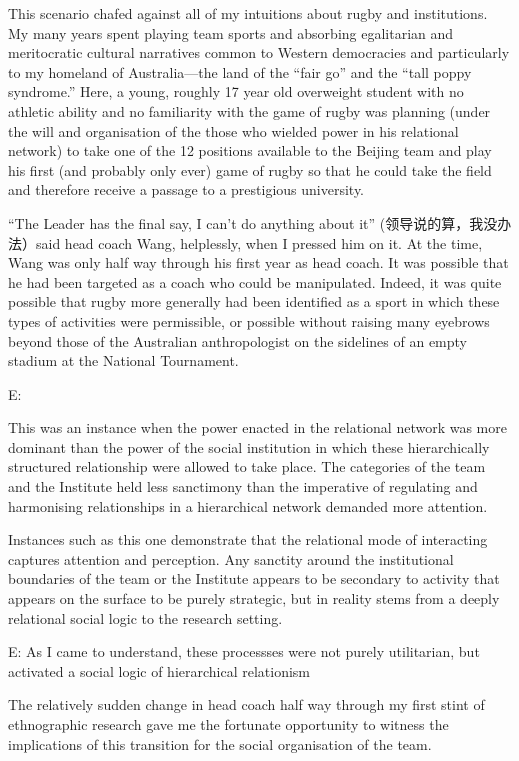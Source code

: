 \begin{CJK}{UTF8}{gbsn}
This scenario chafed against all of my intuitions about rugby and institutions.  My many years spent playing team sports and absorbing egalitarian and meritocratic cultural narratives common to Western democracies and particularly to my homeland of Australia---the land of the ``fair go'' and the ``tall poppy syndrome.''  Here, a young, roughly 17 year old overweight student with no athletic ability and no familiarity with the game of rugby was planning (under the will and organisation of the those who wielded power in his relational network) to take one of the 12 positions available to the Beijing team and play his first (and probably only ever) game of rugby so that he could take the field and therefore receive a passage to a prestigious university.

``The Leader has the final say, I can't do anything about it'' (领导说的算，我没办法）said head coach Wang, helplessly, when I pressed him on it.  At the time, Wang was only half way through his first year as head coach.  It was possible that he had been targeted as a coach who could be manipulated.  Indeed, it was quite possible that rugby more generally had been identified as a sport in which these types of activities were permissible, or possible without raising many eyebrows beyond those of the Australian anthropologist on the sidelines of an empty stadium at the National Tournament.

E:

This was an instance when the power enacted in the relational network was more dominant than the power of the social institution in which these hierarchically structured relationship were allowed to take place.  The categories of the team and the Institute held less sanctimony than the imperative of regulating and harmonising relationships in a hierarchical network demanded more attention.

Instances such as this one demonstrate that the relational mode of interacting captures attention and perception. Any sanctity around the institutional boundaries of the team or the Institute appears to be secondary to activity that appears on the surface to be purely strategic, but in reality stems from a deeply relational social logic to the research setting.


E: As I came to understand, these processses were not purely utilitarian, but activated a social logic of hierarchical relationism



The relatively sudden change in head coach half way through my first stint of ethnographic research gave me the fortunate opportunity to witness the implications of this transition for the social organisation of the team.


\end{CJK}
